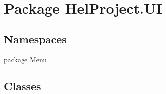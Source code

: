 \hypertarget{namespace_hel_project_1_1_u_i}{}\section{Package Hel\+Project.\+U\+I}
\label{namespace_hel_project_1_1_u_i}
\subsection*{Namespaces}
\begin{DoxyCompactItemize}
\item 
package \hyperlink{namespace_hel_project_1_1_u_i_1_1_menu}{Menu}
\end{DoxyCompactItemize}
\subsection*{Classes}
